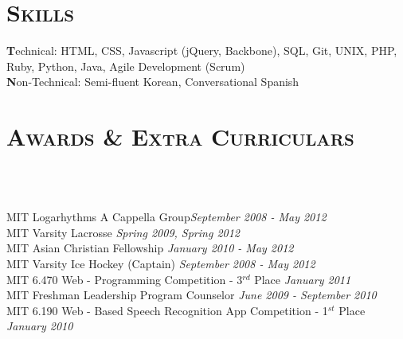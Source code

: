 \begin{resume}
%

\section{\textsc{Skills}}

\textbf Technical: HTML, CSS, Javascript (jQuery, Backbone), SQL, Git, UNIX, PHP, Ruby, Python, Java, Agile Development (Scrum)\\
\textbf Non-Technical: Semi-fluent Korean, Conversational Spanish

\section{\textsc{Awards \& Extra Curriculars}}

\begin{formatb}
  \\
  \body\\
\end{formatb}
MIT Logarhythms A Cappella Group\hfill{\em{September 2008 - May 2012}}\\
MIT Varsity Lacrosse \hfill{\em{Spring 2009, Spring 2012}}\\
MIT Asian Christian Fellowship \hfill{\em{January 2010 - May 2012}}\\
MIT Varsity Ice Hockey (Captain) \hfill{\em{September 2008 - May 2012}}\\
MIT 6.470 Web - Programming Competition - 3$^{rd}$ Place \hfill{\em{January 2011}}\\
MIT Freshman Leadership Program Counselor \hfill{\em{June 2009 - September 2010}}\\
MIT 6.190 Web - Based Speech Recognition App Competition - 1$^{st}$ Place \hfill{\em{January 2010}}\\




\end{resume}
